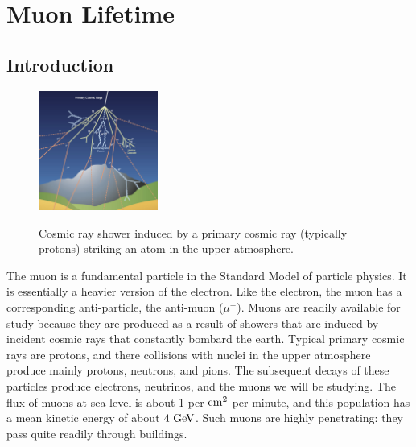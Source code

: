 \chapter{Muon Lifetime}

\section{Introduction}

\begin{figure}[htbp]
\begin{center}
{\includegraphics[width=0.35\textwidth]{figs/labs/muon/cosmic_ray.jpg}}\\
\end{center}
\caption{\label{fig:cosmic}  Cosmic ray shower induced by a primary cosmic ray (typically protons) striking an atom in the upper atmosphere.}\end{figure}

The muon is a fundamental particle in the Standard Model of particle
physics.  It is essentially a heavier version of the electron.  Like
the electron, the muon has a corresponding anti-particle, the
anti-muon ($\mu^+$).  Muons are readily available for study because
they are produced as a result of showers that are induced by incident
cosmic rays that constantly bombard the earth.  Typical primary cosmic
rays are protons, and there collisions with nuclei in the upper
atmosphere produce mainly protons, neutrons, and pions.  The
subsequent decays of these particles produce electrons, neutrinos, and
the muons we will be studying.  The flux of muons at sea-level is
about 1 per ${\rm cm}^2$ per minute, and this population has a mean
kinetic energy of about $4~\rm GeV$.  Such muons are highly
penetrating: they pass quite readily through buildings.

